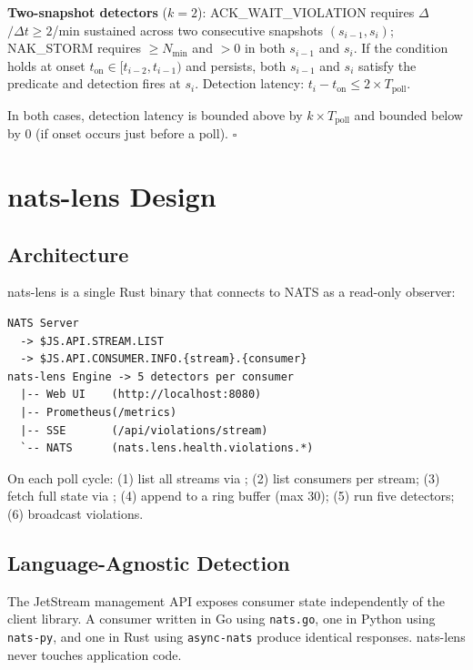 \documentclass[sigconf,nonacm]{acmart}
\begin{document}
\textbf{Two-snapshot detectors} ($k=2$): ACK\_WAIT\_\allowbreak VIOLATION
requires $\Delta$${}/\Delta t \geq 2$/min sustained
across two consecutive snapshots $(s_{i-1}, s_i)$; NAK\_STORM requires
${}\geq N_\mathrm{min}$ and ${}>0$
in both $s_{i-1}$ and $s_i$. If the condition holds at onset
$t_\mathrm{on} \in [t_{i-2}, t_{i-1})$ and persists, both $s_{i-1}$ and $s_i$
satisfy the predicate and detection fires at $s_i$.
Detection latency: $t_i - t_\mathrm{on} \leq 2 \times T_\mathrm{poll}$.

In both cases, detection latency is bounded above by $k \times T_\mathrm{poll}$
and bounded below by 0 (if onset occurs just before a poll). $\square$

\section{nats-lens Design}

\subsection{Architecture}

nats-lens is a single Rust binary that connects to NATS as a read-only observer:

\begin{lstlisting}
NATS Server
  -> $JS.API.STREAM.LIST
  -> $JS.API.CONSUMER.INFO.{stream}.{consumer}
nats-lens Engine -> 5 detectors per consumer
  |-- Web UI    (http://localhost:8080)
  |-- Prometheus(/metrics)
  |-- SSE       (/api/violations/stream)
  `-- NATS      (nats.lens.health.violations.*)
\end{lstlisting}

On each poll cycle: (1) list all streams via ;
(2) list consumers per stream; (3) fetch full state via
; (4) append to a ring buffer (max 30);
(5) run five detectors; (6) broadcast violations.

\subsection{Language-Agnostic Detection}

The JetStream management API exposes consumer state independently of the
client library. A consumer written in Go using \texttt{nats.go}, one in
Python using \texttt{nats-py}, and one in Rust using \texttt{async-nats}
produce identical  responses. nats-lens
never touches application code.
\end{document}
